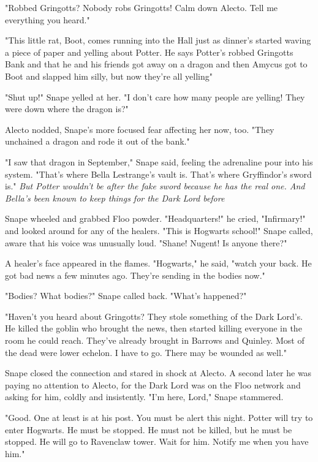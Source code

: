 "Robbed Gringotts? Nobody robs Gringotts! Calm down Alecto. Tell me everything you heard."

"This little rat, Boot, comes running into the Hall just as dinner's started waving a piece of paper and yelling about Potter. He says Potter's robbed Gringotts Bank and that he and his friends got away on a dragon{\el} and then Amycus got to Boot and slapped him silly, but now they're all yelling{\el}"

"Shut up!" Snape yelled at her. "I don't care how many people are yelling! They were down where the dragon is?"

Alecto nodded, Snape's more focused fear affecting her now, too. "They unchained a dragon and rode it out of the bank."

"I saw that dragon in September," Snape said, feeling the adrenaline pour into his system. "That's where Bella Lestrange's vault is. That's where Gryffindor's sword is." \emph{But Potter wouldn't be after the fake sword because he has the real one. And Bella's been known to keep things for the Dark Lord before{\el}}

Snape wheeled and grabbed Floo powder. "Headquarters!" he cried, "Infirmary!" and looked around for any of the healers. "This is Hogwarts school!" Snape called, aware that his voice was unusually loud. "Shane! Nugent! Is anyone there?"

A healer's face appeared in the flames. "Hogwarts," he said, "watch your back. He got bad news a few minutes ago. They're sending in the bodies now."

"Bodies? What bodies?" Snape called back. "What's happened?"

"Haven't you heard about Gringotts? They stole something of the Dark Lord's. He killed the goblin who brought the news, then started killing everyone in the room he could reach. They've already brought in Barrows and Quinley. Most of the dead were lower echelon. I have to go. There may be wounded as well."

Snape closed the connection and stared in shock at Alecto. A second later he was paying no attention to Alecto, for the Dark Lord was on the Floo network and asking for him, coldly and insistently. "I'm here, Lord," Snape stammered.

"Good. One at least is at his post. You must be alert this night. Potter will try to enter Hogwarts. He must be stopped. He must not be killed, but he must be stopped. He will go to Ravenclaw tower. Wait for him. Notify me when you have him."

